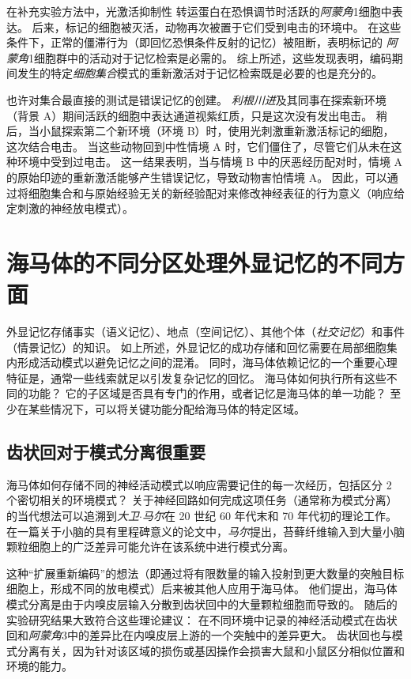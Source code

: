 在补充实验方法中，光激活抑制性  转运蛋白在恐惧调节时活跃的\textit{阿蒙角}1细胞中表达。
后来，标记的细胞被灭活，动物再次被置于它们受到电击的环境中。
在这些条件下，正常的僵滞行为（即回忆恐惧条件反射的记忆）被阻断，表明标记的 \textit{阿蒙角}1细胞群中的活动对于记忆检索是必需的。
综上所述，这些发现表明，编码期间发生的特定\textit{细胞集合}模式的重新激活对于记忆检索既是必要的也是充分的。


也许对集合最直接的测试是错误记忆的创建。
\textit{利根川进}及其同事在探索新环境（背景 A）期间活跃的细胞中表达通道视紫红质，只是这次没有发出电击。
稍后，当小鼠探索第二个新环境（环境 B）时，使用光刺激重新激活标记的细胞，这次结合电击。
当这些动物回到中性情境 A 时，它们僵住了，尽管它们从未在这种环境中受到过电击。
这一结果表明，当与情境 B 中的厌恶经历配对时，情境 A 的原始印迹的重新激活能够产生错误记忆，导致动物害怕情境 A。
因此，可以通过将细胞集合和与原始经验无关的新经验配对来修改神经表征的行为意义（响应给定刺激的神经放电模式）。



\section{海马体的不同分区处理外显记忆的不同方面}

外显记忆存储事实（语义记忆）、地点（空间记忆）、其他个体（\textit{社交记忆}）和事件（情景记忆）的知识。
如上所述，外显记忆的成功存储和回忆需要在局部细胞集内形成活动模式以避免记忆之间的混淆。
同时，海马体依赖记忆的一个重要心理特征是，通常一些线索就足以引发复杂记忆的回忆。
海马体如何执行所有这些不同的功能？
它的子区域是否具有专门的作用，或者记忆是海马体的单一功能？
至少在某些情况下，可以将关键功能分配给海马体的特定区域。



\subsection{齿状回对于模式分离很重要}

海马体如何存储不同的神经活动模式以响应需要记住的每一次经历，包括区分 2 个密切相关的环境模式？
关于神经回路如何完成这项任务（通常称为模式分离）的当代想法可以追溯到\textit{大卫$\cdot$马尔}在 20 世纪 60 年代末和 70 年代初的理论工作。
在一篇关于小脑的具有里程碑意义的论文中，\textit{马尔}提出，苔藓纤维输入到大量小脑颗粒细胞上的广泛差异可能允许在该系统中进行模式分离。


这种“扩展重新编码”的想法（即通过将有限数量的输入投射到更大数量的突触目标细胞上，形成不同的放电模式）后来被其他人应用于海马体。
他们提出，海马体模式分离是由于内嗅皮层输入分散到齿状回中的大量颗粒细胞而导致的。
随后的实验研究结果大致符合这些理论建议：
在不同环境中记录的神经活动模式在齿状回和\textit{阿蒙角}3中的差异比在内嗅皮层上游的一个突触中的差异更大。
齿状回也与模式分离有关，因为针对该区域的损伤或基因操作会损害大鼠和小鼠区分相似位置和环境的能力。


